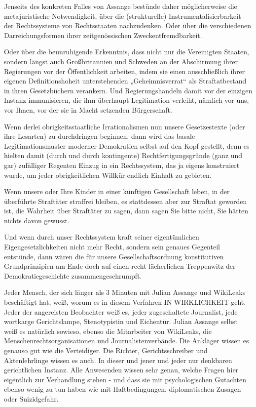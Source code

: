 \begin{multicols}{2}
Jenseits des konkreten Falles von Assange bestünde
daher möglicherweise die metajuristische Notwendigkeit, über die (strukturelle) Instrumentalisierbarkeit der
Rechtssysteme von Rechtsstaaten nachzudenken. Oder
über die verschiedenen Darreichungsformen ihrer zeitgenössischen Zweckentfremdbarkeit.

Oder über die beunruhigende Erkenntnis, dass nicht
nur die Vereinigten Staaten, sondern längst auch Großbritannien und Schweden an der Abschirmung ihrer
Regierungen vor der Öffentlichkeit arbeiten, indem sie
einen ausschließlich ihrer eigenen Definitionshoheit
unterstehenden „Geheimnisverrat“ als Straftatbestand
in ihren Gesetzbüchern verankern. Und Regierungshandeln damit vor der einzigen Instanz immunisieren, die
ihm überhaupt Legitimation verleiht, nämlich vor uns,
vor Ihnen, vor der sie in Macht setzenden Bürgerschaft.

Wenn derlei obrigkeitsstaatliche Irrationalismen nun
unsere Gesetzestexte (oder ihre Lesarten) zu durchdringen beginnen, dann wird das basale Legitimationsmuster moderner Demokratien selbst auf den Kopf gestellt,
denn es hielten damit (durch und durch kontingente)
Rechtfertigungsgründe (ganz und gar) zufälliger Regenten Einzug in ein Rechtssystem, das ja eigens konstruiert
wurde, um jeder obrigkeitlichen Willkür endlich Einhalt
zu gebieten.

Wenn unsere oder Ihre Kinder in einer künftigen Gesellschaft leben, in der überführte Straftäter straffrei bleiben, es stattdessen aber zur Straftat geworden ist, die
Wahrheit über Straftäter zu sagen, dann sagen Sie bitte
nicht, Sie hätten nichts davon gewusst.

Und wenn durch unser Rechtssystem kraft seiner eigentümlichen Eigengesetzlichkeiten nicht mehr Recht, sondern sein genaues Gegenteil entstünde, dann wären die
für unsere Gesellschaftsordnung konstitutiven Grundprinzipien am Ende doch auf einen recht lächerlichen
Treppenwitz der Demokratiegeschichte zusammengeschrumpft.

Jeder Mensch, der sich länger als 3 Minuten mit Julian
Assange und WikiLeaks beschäftigt hat, weiß, worum es
in diesem Verfahren IN WIRKLICHKEIT geht. Jeder der
angereisten Beobachter weiß es, jeder zugeschaltete
Journalist, jede wortkarge Gerichtslampe, Stenotypistin
und Eichentür. Julian Assange selbst weiß es natürlich
sowieso, ebenso die Mitarbeiter von WikiLeaks, die Menschenrechtsorganisationen und Journalistenverbände.
Die Ankläger wissen es genauso gut wie die Verteidiger.
Die Richter, Gerichtsschreiber und Aktenlehrlinge wissen es auch. In dieser und jener und jeder nur denkbaren gerichtlichen Instanz. Alle Anwesenden wissen sehr
genau, welche Fragen hier eigentlich zur Verhandlung
stehen - und dass sie mit psychologischen Gutachten
ebenso wenig zu tun haben wie mit Haftbedingungen,
diplomatischen Zusagen oder Suizidgefahr.


\end{multicols}
